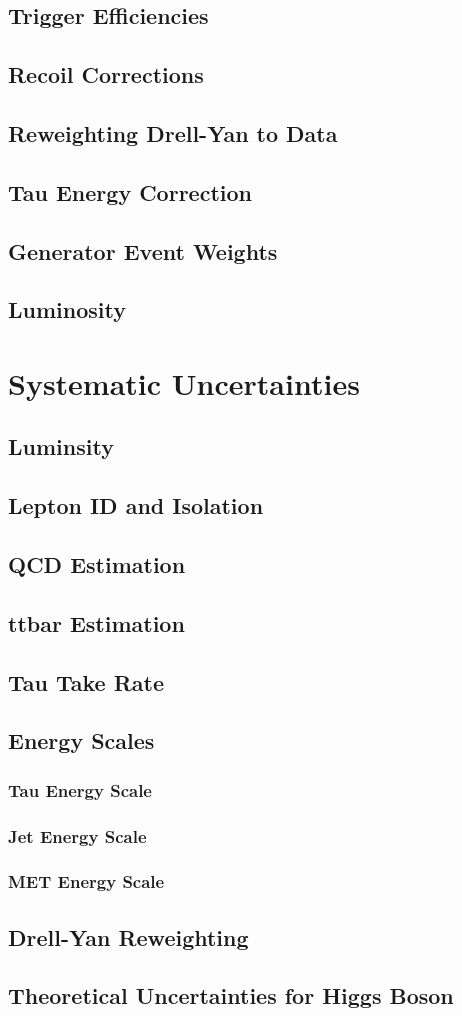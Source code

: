 \subsection{Trigger Efficiencies}
\subsection{Recoil Corrections}
\subsection{Reweighting Drell-Yan to Data}
\subsection{Tau Energy Correction}
\subsection{Generator Event Weights}
\subsection{Luminosity}

\pagebreak

\section{Systematic Uncertainties}
\subsection{Luminsity}
\subsection{Lepton ID and Isolation}
\subsection{QCD Estimation}
\subsection{ttbar Estimation}
\subsection{Tau Take Rate}
\subsection{Energy Scales}
\subsubsection{Tau Energy Scale}
\subsubsection{Jet Energy Scale}
\subsubsection{MET Energy Scale}
\subsection{Drell-Yan Reweighting}
\subsection{Theoretical Uncertainties for Higgs Boson}



